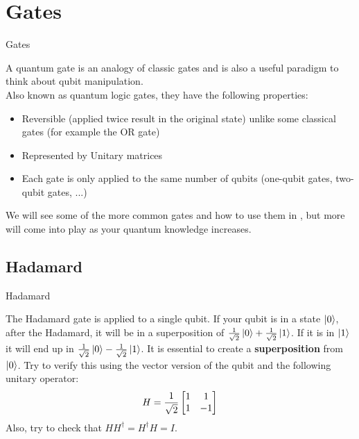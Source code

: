 \documentclass[aspectratio=43]{beamer}
\begin{document}
\section{\q Gates}
\begin{frame}{\q Gates}
\begin{card}
    A quantum gate is an analogy of classic gates and is also a useful paradigm to think about qubit manipulation.\\ Also known as quantum logic gates, they have the following properties:
    \begin{itemize}
        \item Reversible (applied twice result in the original state) unlike some classical gates (for example the OR gate)
        \item Represented by Unitary matrices
        \item Each gate is only applied to the same number of qubits (one-qubit gates, two-qubit gates, ...)
    \end{itemize}
    We will see some of the more common gates and how to use them in \qk, but more will come into play as your quantum knowledge increases.
\end{card}
\pagenumber
\end{frame}



\subsection{Hadamard}
\begin{frame}{Hadamard}
\begin{cardTiny}
    The Hadamard gate is applied to a single qubit. If your qubit is in a state $\ket{0}$, after the Hadamard, it will be in a superposition of $\frac{1}{\sqrt{2}}\ket{0}+\frac{1}{\sqrt{2}}\ket{1}$. If it is in $\ket{1}$ it will end up in $\frac{1}{\sqrt{2}}\ket{0}-\frac{1}{\sqrt{2}}\ket{1}$. It is essential to create a \textbf{superposition} from $\ket{0}$. Try to verify this using the vector version of the qubit and the following unitary operator:
    \begin{equation*}
        H=\frac{1}{\sqrt{2}}\begin{bmatrix}1 & 1\\1 & -1\end{bmatrix}
    \end{equation*}
    Also, try to check that $HH^\dag=H^\dag H = I$.
\end{cardTiny}
\pagenumber
\end{frame}
\end{document}

